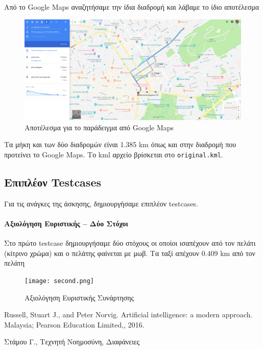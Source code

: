 \documentclass[a4paper,12pt]{article}
\begin{document}
Από το Google Maps αναζητήσαμε την ίδια διαδρομή και λάβαμε το ίδιο αποτέλεσμα

\begin{figure}[H]
    \centering
    \includegraphics[scale=0.25]{correct.png}
    \caption{Αποτέλεσμα για το παράδειγμα από Google Maps}
    \label{fig:my_label}
\end{figure}

Τα μήκη και των δύο διαδρομών είναι 1.385 km όπως και στην διαδρομή που προτείνει το Google Maps. Το kml αρχείο βρίσκεται στο \texttt{original.kml}.


\subsection{Επιπλέον Testcases}

Για τις ανάγκες της άσκησης, δημιουργήσαμε επιπλέον testcases. 

\paragraph{Αξιολόγηση Ευριστικής -- Δύο Στόχοι} Στο πρώτο testcase δημιουργήσαμε δύο στόχους οι οποίοι ισαπέχουν από τον πελάτι (κίτρινο χρώμα) και ο πελάτης φαίνεται με μωβ. Τα ταξί απέχουν 0.409 km από τον πελάτη

\begin{figure}[htp]
\centering
\texttt{[image: second.png]}
\caption{Αξιολόγηση Ευριστικής Συνάρτησης}
\label{}
\end{figure}  


\begin{thebibliography}{9}

 Russell, Stuart J., and Peter Norvig. Artificial intelligence: a modern approach. Malaysia; Pearson Education Limited,, 2016.

 Στάμου Γ., Τεχνητή Νοημοσύνη, Διαφάνειες

\end{thebibliography}
\end{document}
